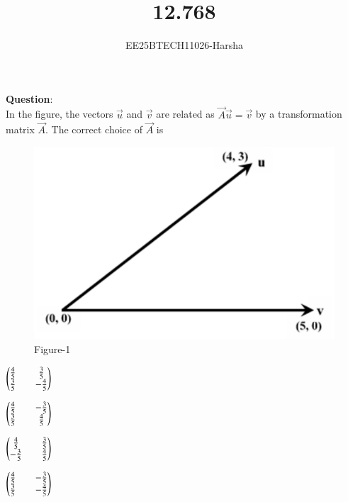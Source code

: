 \documentclass[journal]{IEEEtran}
\begin{document}

\vspace{3cm}

\title{12.768}
\author{EE25BTECH11026-Harsha}
 \maketitle
{\let\newpage\relax\maketitle}

\renewcommand{\thefigure}{\theenumi}
\renewcommand{\thetable}{\theenumi}
\setlength{\intextsep}{10pt} %


\renewcommand{\thetable}{\theenumi}

\textbf{Question}:\\
In the figure, the vectors $\vec{u}$ and $\vec{v}$ are related as $\vec{A}\vec{u}=\vec{v}$ by a transformation matrix $\vec{A}$. The correct choice of $\vec{A}$ is
\begin{figure}[H]
    \centering
    \includegraphics[width=0.4\columnwidth]{figs/Fig-1.png}
    \caption{Figure-1}
    \label{fig:1}
\end{figure}
\begin{enumerate}
\begin{multicols}{4}
    \item $\begin{pmatrix}\tfrac{4}{5}&&\tfrac{3}{5}\\\tfrac{3}{5}&&-\tfrac{4}{5}\end{pmatrix}$
    \item $\begin{pmatrix}\tfrac{4}{5}&&-\tfrac{3}{5}\\\tfrac{3}{5}&&\tfrac{4}{5}\end{pmatrix}$
    \item $\begin{pmatrix}\tfrac{4}{5}&&\tfrac{3}{5}\\-\tfrac{3}{5}&&\tfrac{4}{5}\end{pmatrix}$
    \item $\begin{pmatrix}\tfrac{4}{5}&&-\tfrac{3}{5}\\\tfrac{3}{5}&&-\tfrac{4}{5}\end{pmatrix}$
\end{multicols}
\end{enumerate}
\end{document}
